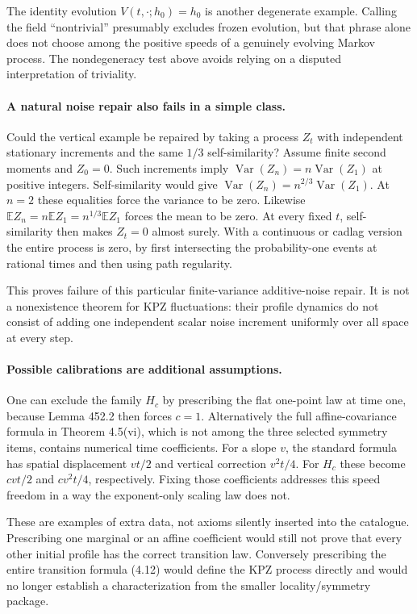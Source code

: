 \documentclass[11pt]{article}
\begin{document}
The identity evolution $V(t,\cdot;h_0)=h_0$ is another degenerate
example. Calling the field ``nontrivial'' presumably excludes frozen
evolution, but that phrase alone does not choose among the positive
speeds of a genuinely evolving Markov process. The nondegeneracy test
above avoids relying on a disputed interpretation of triviality.

\paragraph{A natural noise repair also fails in a simple class.}
Could the vertical example be repaired by taking a process $Z_t$ with
independent stationary increments and the same $1/3$ self-similarity?
Assume finite second moments and $Z_0=0$. Such increments imply
$\operatorname{Var}(Z_n)=n\operatorname{Var}(Z_1)$ at positive integers.
Self-similarity would give
$\operatorname{Var}(Z_n)=n^{2/3}\operatorname{Var}(Z_1)$.
At $n=2$ these equalities force the variance to be zero. Likewise
$\mathbb E Z_n=n\mathbb E Z_1=n^{1/3}\mathbb E Z_1$ forces the mean
to be zero. At every fixed $t$, self-similarity then makes $Z_t=0$
almost surely. With a continuous or cadlag version the entire process
is zero, by first intersecting the probability-one events at rational
times and then using path regularity.

This proves failure of this particular finite-variance additive-noise
repair. It is not a nonexistence theorem for KPZ fluctuations: their
profile dynamics do not consist of adding one independent scalar noise
increment uniformly over all space at every step.

\paragraph{Possible calibrations are additional assumptions.}
One can exclude the family $H_c$ by prescribing the flat one-point law
at time one, because Lemma 452.2 then forces $c=1$. Alternatively the
full affine-covariance formula in Theorem 4.5(vi), which is not among
the three selected symmetry items, contains numerical time coefficients.
For a slope $v$, the standard formula has spatial displacement $vt/2$
and vertical correction $v^2t/4$. For $H_c$ these become $cvt/2$ and
$cv^2t/4$, respectively. Fixing those coefficients addresses this speed
freedom in a way the exponent-only scaling law does not.

These are examples of extra data, not axioms silently inserted into the
catalogue. Prescribing one marginal or an affine coefficient would still
not prove that every other initial profile has the correct transition
law. Conversely prescribing the entire transition formula (4.12) would
define the KPZ process directly and would no longer establish a
characterization from the smaller locality/symmetry package.
\end{document}

